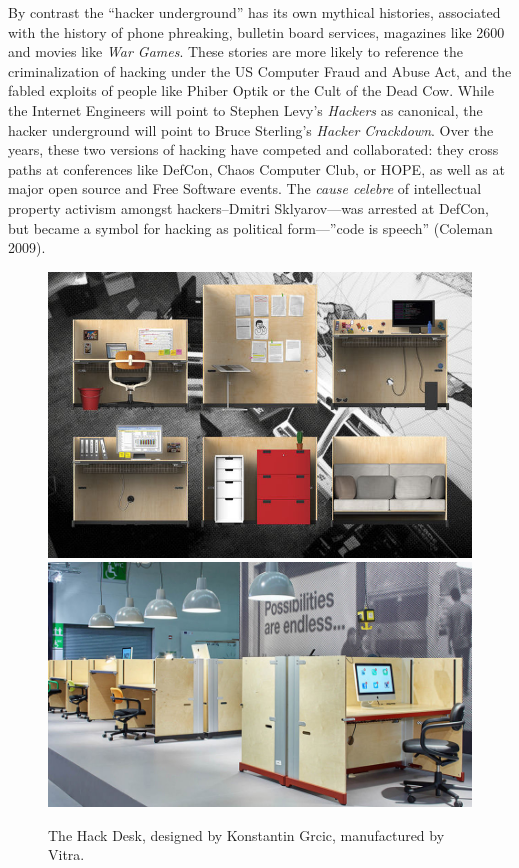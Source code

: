 \documentclass[10pt,letter,oneside]{scrartcl}
\begin{document}
By contrast the ``hacker underground'' has its own mythical histories, associated with the history of phone phreaking, bulletin board services, magazines like 2600 and movies like \emph{War Games}.  These stories are more likely to reference the criminalization of hacking under the US Computer Fraud and Abuse Act, and the fabled exploits of people like Phiber Optik or the Cult of the Dead Cow.  While the Internet Engineers will point to Stephen Levy's \emph{Hackers} as canonical, the hacker underground will point to Bruce Sterling's \emph{Hacker Crackdown}.  Over the years, these two versions of hacking have competed and collaborated: they cross paths at conferences like DefCon, Chaos Computer Club, or HOPE, as well as at major open source and Free Software events.  The \emph{cause celebre} of intellectual property activism amongst hackers--Dmitri Sklyarov---was arrested at DefCon, but became a symbol for hacking as political form---''code is speech'' (Coleman 2009). 



\begin{figure}
  \centering
  \includegraphics[scale=0.6]{images/Workspirit13HACKStudioAKFB3}
  \includegraphics[scale=0.4]{images/HackDeskGrcic}
  \caption{The Hack Desk, designed by Konstantin Grcic, manufactured by Vitra.}
  \label{fig:hackdeskimage}
\end{figure}
\end{document}
